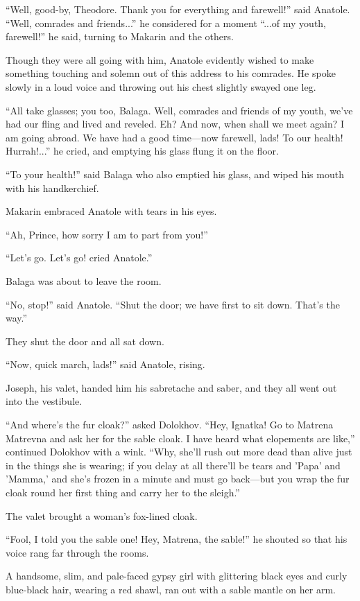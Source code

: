 ``Well, good-by, Theodore. Thank you for everything and
farewell!'' said Anatole. ``Well, comrades and friends...'' he
considered for a moment ``...of my youth, farewell!'' he said,
turning to Makarin and the others.

Though they were all going with him, Anatole evidently wished to
make something touching and solemn out of this address to his
comrades. He spoke slowly in a loud voice and throwing out his
chest slightly swayed one leg.

``All take glasses; you too, Balaga. Well, comrades and friends
of my youth, we've had our fling and lived and reveled. Eh? And
now, when shall we meet again? I am going abroad. We have had a
good time---now farewell, lads! To our health! Hurrah!...'' he
cried, and emptying his glass flung it on the floor.

``To your health!'' said Balaga who also emptied his glass, and
wiped his mouth with his handkerchief.

Makarin embraced Anatole with tears in his eyes.

``Ah, Prince, how sorry I am to part from you!''

``Let's go. Let's go! cried Anatole.''

Balaga was about to leave the room.

``No, stop!'' said Anatole. ``Shut the door; we have first to sit
down.  That's the way.''

They shut the door and all sat down.

``Now, quick march, lads!'' said Anatole, rising.

Joseph, his valet, handed him his sabretache and saber, and they
all went out into the vestibule.

``And where's the fur cloak?'' asked Dolokhov. ``Hey, Ignatka! Go
to Matrena Matrevna and ask her for the sable cloak. I have heard
what elopements are like,'' continued Dolokhov with a
wink. ``Why, she'll rush out more dead than alive just in the
things she is wearing; if you delay at all there'll be tears and
'Papa' and 'Mamma,' and she's frozen in a minute and must go
back---but you wrap the fur cloak round her first thing and carry
her to the sleigh.''

The valet brought a woman's fox-lined cloak.

``Fool, I told you the sable one! Hey, Matrena, the sable!'' he
shouted so that his voice rang far through the rooms.

A handsome, slim, and pale-faced gypsy girl with glittering black
eyes and curly blue-black hair, wearing a red shawl, ran out with
a sable mantle on her arm.

